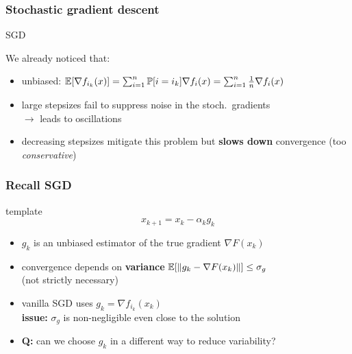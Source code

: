 \documentclass[aspectratio=149]{beamer}
\begin{document}
\begin{frame}
  \frametitle{Stochastic gradient descent}
  \begin{algorithm}[H]
    \caption{SGD}\label{sgd}
    \begin{algorithmic}[1]
      \EndFor{}
    \end{algorithmic}
  \end{algorithm}

  We already noticed that:
  \begin{itemize}
    \item unbiased: $\mathbb{E}[\nabla f_{i_k}(x)] = \sum_{i=1}^{n} \mathbb{P}[i=i_k] \nabla f_i(x) = \sum_{i=1}^{n} \frac{1}{n} \nabla f_i(x)$
    \item large stepsizes fail to suppress noise in the stoch.\ gradients \\
          $\rightarrow$ leads to oscillations
    \item decreasing stepsizes mitigate this problem but \textbf{slows down} convergence (too \emph{conservative})
  \end{itemize}

\end{frame}


\begin{frame}
  \frametitle{Recall SGD}
  \begin{block}{template}
    \begin{equation}
      x_{k+1} = x_k - \alpha_k g_k
    \end{equation}
  \end{block}
  \begin{itemize}
    \item $g_k$ is an unbiased estimator of the true gradient $\nabla F(x_k)$
    \item convergence depends on \textbf{variance} $\mathbb{E} [ \Vert g_k - \nabla F(x_k) \Vert ] \le \sigma_g$ \\
          (not strictly necessary)
    \item vanilla SGD uses $g_k = \nabla f_{i_k}(x_k)$ \\
          \textbf{issue:} $\sigma_g$ is non-negligible even close to the solution
    \item \textbf{Q:} can we choose $g_k$ in a different way to reduce variability?
  \end{itemize}

\end{frame}
\end{document}
